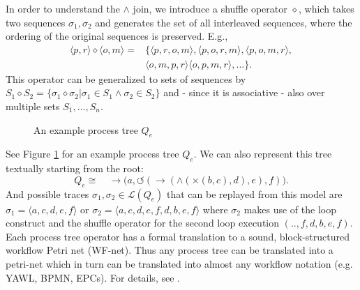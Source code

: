 \documentclass[a4paper]{IEEEtran}
\begin{document}
In order to understand the $\wedge$ join, we introduce a shuffle operator $\diamond$, which takes two sequences $\sigma_1, \sigma_2$ and generates the set of all interleaved sequences, where the ordering of the original sequences is preserved. E.g.,
\begin{align*}
\langle p,r\rangle \diamond \langle o,m \rangle = &\{ \langle p,r,o,m \rangle, \langle p,o,r,m \rangle, \langle p,o,m,r \rangle, \\ 
& \langle o,m,p,r \rangle \langle o,p,m,r\rangle, ... \}.
\end{align*}
This operator can be generalized to sets of sequences by $S_1 \diamond S_2 = \{ \sigma_1 \diamond \sigma_2 | \sigma_1 \in S_1 \wedge \sigma_2 \in S_2 \}$ and - since it is associative - also over multiple sets $S_1, \dots, S_n$.

\begin{figure}[h!]
    \centering
    \usetikzlibrary{graphdrawing.trees}
\caption{An example process tree $Q_e$}
\label{fig:tree}
\end{figure}

See Figure \ref{fig:tree} for an example process tree $Q_e$. We can also represent this tree textually starting from the root:
\begin{equation}
    Q_e \cong \quad \rightarrow\big(a, \circlearrowleft(\rightarrow(\wedge(\times(b,c),d),e),f)\big).
\end{equation}
And possible traces $\sigma_1, \sigma_2 \in \mathcal{L}(Q_e)$ that can be replayed from this model are $\sigma_1 = \langle a, c, d, e, f\rangle $ or $\sigma_2 = \langle a, c, d, e, f, d, b, e, f\rangle$ where $\sigma_2$ makes use of the loop construct and the shuffle operator for the second loop execution $(.., f, d, b, e, f)$.
Each process tree operator has a formal translation to a sound, block-structured workflow Petri net (WF-net). Thus any process tree can be translated into a petri-net which in turn can be translated into almost any workflow notation (e.g. YAWL, BPMN, EPCs). For details, see \cite{buijs2012treetranslation}.
\end{document}
